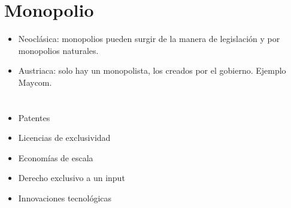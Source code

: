\section{Monopolio}
\begin{itemize}
    \item Neoclásica: monopolios pueden surgir de la manera de legislación y por monopolios naturales. 
    \item Austriaca: solo hay un monopolista, los creados por el gobierno. Ejemplo Maycom.
\end{itemize}

\section{ }
\begin{itemize}
    \item Patentes 
    \item Licencias de exclusividad 
    \item Economías de escala 
    \item Derecho exclusivo a un input 
    \item Innovaciones tecnológicas
\end{itemize}

